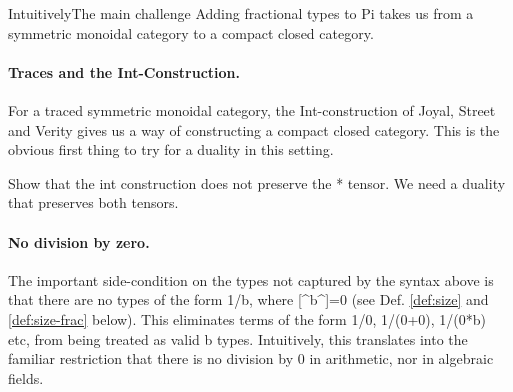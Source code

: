 \documentclass[preprint]{sigplanconf}
\begin{document}
IntuitivelyThe main challenge Adding fractional types to
{{Pi}} takes us from a symmetric monoidal category to a compact closed
category.

%


\paragraph*{Traces and the Int-Construction.}
For a traced symmetric monoidal category, the Int-construction of
Joyal, Street and Verity \cite{joyal1996traced} gives us a way of
constructing a compact closed category. This is the obvious first
thing to try for a duality in this setting.



Show that the int construction does not preserve the {{*}} tensor. We
need a duality that preserves both tensors.

\paragraph*{No division by zero.} 
The important side-condition on the types not captured by the syntax
above is that there are no types of the form {{1/b}}, where
{{[^b^]=0}} (see Def. \ref{def:size} and \ref{def:size-frac}
below). This eliminates terms of the form {{1/0}}, {{1/(0+0)}},
{{1/(0*b)}} etc, from being treated as valid {{b}} types. Intuitively,
this translates into the familiar restriction that there is no
division by 0 in arithmetic, nor in algebraic fields.

\begin{multicols}{2}  

\end{multicols}
\end{document}
